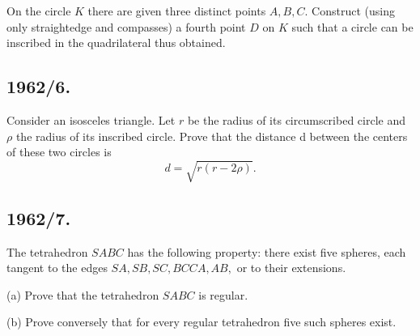 \documentclass[12pt,thmsa]{article}
\begin{document}
On the circle $K$ there are given three distinct points $A,B,C.$ Construct
(using only straightedge and compasses) a fourth point $D$ on $K$ such that
a circle can be inscribed in the quadrilateral thus obtained.

\subsection{1962/6.}

Consider an isosceles triangle. Let $r$ be the radius of its circumscribed
circle and $\rho $ the radius of its inscribed circle. Prove that the
distance d between the centers of these two circles is
\[
d=\sqrt{r(r-2\rho )}.
\]

\subsection{1962/7.}

The tetrahedron $SABC$ has the following property: there exist five spheres,
each tangent to the edges $SA,SB,SC,BCCA,AB,$ or to their extensions.

(a) Prove that the tetrahedron $SABC$ is regular.

(b) Prove conversely that for every regular tetrahedron five such spheres
exist.
\end{document}
